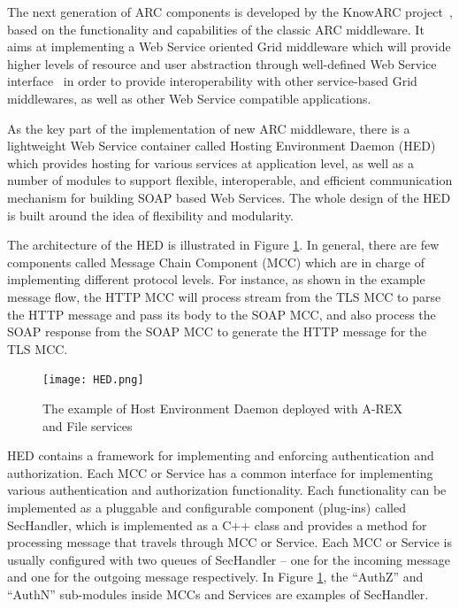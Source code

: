 \documentclass[conference]{IEEEtran}
\begin{document}
The next generation of ARC components is developed by the KnowARC project~\cite{KnowARClink}, based on the functionality and capabilities of the classic ARC middleware. It aims at implementing a Web Service oriented Grid middleware which will provide higher levels of resource and user abstraction through well-defined Web Service interface~\cite{KnowARCDesignlink} in order to provide interoperability with other service-based Grid middlewares, as well as other Web Service compatible applications.

As the key part of the implementation of new ARC middleware, there is a lightweight Web Service container called Hosting Environment Daemon (HED) which provides hosting for various services at application level, as well as a number of modules to support flexible, interoperable, and efficient communication mechanism for building SOAP based Web Services. The whole design of the HED is built around the idea of flexibility and modularity.

The architecture of the HED is illustrated in Figure \ref{fig:HED}. In general, there are few components called Message Chain Component (MCC) which are in charge of implementing different protocol levels. For instance, as shown in the example message flow, the HTTP MCC will process stream from the TLS MCC to parse the HTTP message and pass its body to the SOAP MCC, and also process the SOAP response from the SOAP MCC to generate the HTTP message for the TLS MCC.

\begin{figure}
\texttt{[image: HED.png]}
\caption{The example of Host Environment Daemon deployed with A-REX and File services}
\label{fig:HED}
\end{figure}
HED contains a framework for implementing and enforcing authentication and authorization. Each MCC or Service has a common interface for implementing various authentication and authorization functionality. Each functionality can be implemented as a pluggable and configurable component (plug-ins) called SecHandler, which is implemented as a C++ class and provides a method for processing message that travels through MCC or Service. Each MCC or Service is usually configured with two queues of SecHandler -- one for the incoming message and one for the outgoing message respectively. In Figure \ref{fig:HED}, the ``AuthZ'' and ``AuthN'' sub-modules inside MCCs and Services are examples of SecHandler.

\end{document}
